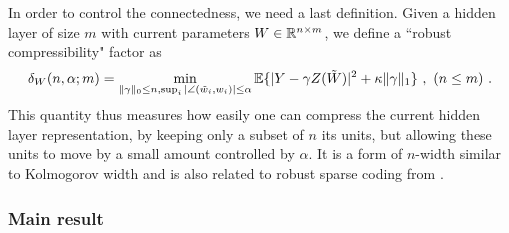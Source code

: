 In order to control the connectedness, we need a last definition. Given a 
hidden layer of size $m$ with current parameters $W \in {\mathbb{R}}^{n \times m}$, we define a
``robust compressibility" factor as 
\begin{equation}
\label{compress}
\delta_W(n, \alpha; m) = \min_{ \|\gamma \|_0 \leq n, \sup_i |\angle(\tilde{w}_i, w_i)| \leq \alpha} {\mathbb{E}} \{| Y - \gamma Z(\tilde{W}) |^2 + \kappa \| \gamma \|_1  \}~,~(n \leq m)~.
\end{equation} 
This quantity thus measures how easily one can compress the current hidden layer representation, 
by keeping only a subset of $n$ its units, but allowing these units to move by a small amount controlled by $\alpha$. It is a form 
of $n$-width similar to Kolmogorov width \cite{donoho2006compressed} and is also related to robust sparse coding from \cite{tang2013compressed, ekanadham2011recovery}.


\subsubsection{Main result}

